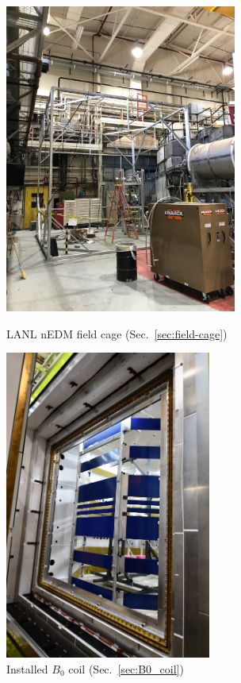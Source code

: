 \begin{figure}
\centering
\begin{minipage}{.5\textwidth}
    \centering
    \includegraphics[height=4in]{figures/field_cage_no_msr.jpg}
    \caption
    {LANL nEDM field cage (Sec.~\ref{sec:field-cage})}
    \label{fig:lanl-field-cage}
\end{minipage}%
\begin{minipage}{.5\textwidth}
    \centering
    \includegraphics[height=4in]{figures/b0_zoom_in.jpg}
    \caption
    {Installed $B_0$ coil (Sec.~\ref{sec:B0_coil})}
    \label{fig:lanl-b0-coil}
\end{minipage}
\end{figure}


